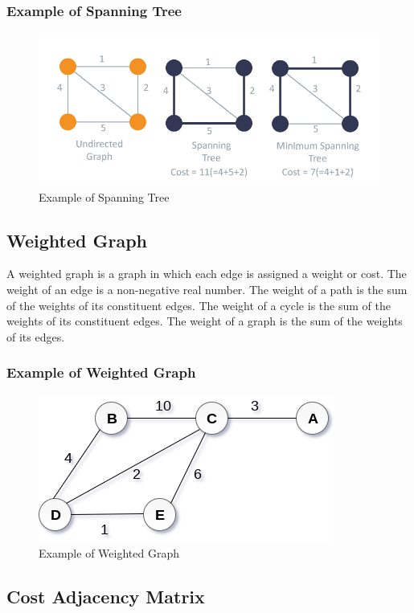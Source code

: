 \documentclass[11pt]{article}
\begin{document}
\subsubsection{Example of Spanning Tree}

\begin{figure}[H]
    \centering
    \includegraphics[width=.75\textwidth]{figures/spanning_tree.png}
    \caption{ Example of Spanning Tree }
\end{figure}

\subsection{Weighted Graph}

A weighted graph is a graph in which each edge is assigned a weight or cost. The weight of an edge is a non-negative real number. The weight of a path is the sum of the weights of its constituent edges. The weight of a cycle is the sum of the weights of its constituent edges. The weight of a graph is the sum of the weights of its edges.

\subsubsection{Example of Weighted Graph}

\begin{figure}[H]
    \centering
    \includegraphics[width=.45\textwidth]{figures/weightedgraph.png}
    \caption{ Example of Weighted Graph }
\end{figure}

\subsection{Cost Adjacency Matrix}
\end{document}
